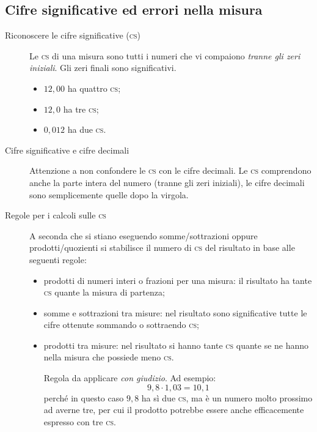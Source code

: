 \documentclass[a4paper,11pt,italian]{article}
\begin{document}
\subsection{Cifre significative ed errori nella misura}

\begin{description}
  \item[Riconoscere le cifre significative (\textsc{cs})] Le \textsc{cs} di una misura sono tutti i numeri che vi compaiono \emph{tranne gli zeri iniziali}. Gli zeri finali sono significativi.
  \begin{multicols}{3}
  \begin{itemize}
    \item $ 12,00 $ ha quattro \textsc{cs};
    \item $ 12,0 $ ha tre \textsc{cs};
    \item $ 0,012 $ ha due \textsc{cs}.
  \end{itemize}
  \end{multicols}

  \item[Cifre significative e cifre decimali] Attenzione a non confondere le \textsc{cs} con le cifre decimali. Le \textsc{cs} comprendono anche la parte intera del numero (tranne gli zeri iniziali), le cifre decimali sono semplicemente quelle dopo la virgola.

  \item[Regole per i calcoli sulle \textsc{cs}] A seconda che si stiano eseguendo somme/sottrazioni oppure prodotti/quozienti si stabilisce il numero di \textsc{cs} del risultato in base alle seguenti regole:\begin{itemize}
    \item prodotti di numeri interi o frazioni per una misura: il risultato ha tante \textsc{cs} quante la misura di partenza;
    \item somme e sottrazioni tra misure: nel risultato sono significative tutte le cifre ottenute sommando o sottraendo \textsc{cs};
    \item prodotti tra misure: nel risultato si hanno tante \textsc{cs} quante se ne hanno nella misura che possiede meno \textsc{cs}.
    
    Regola da applicare \emph{con giudizio}. Ad esempio:
    \[ 9,8 \cdot 1,03 = 10,1 \]
    perché in questo caso $ 9,8  $ ha sì due \textsc{cs}, ma è un numero molto prossimo ad averne tre, per cui il prodotto potrebbe essere anche efficacemente espresso con tre \textsc{cs}.
  \end{itemize}
  

\end{description}
\end{document}
